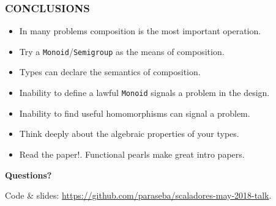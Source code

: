 \documentclass{beamer}
\begin{document}
\begin{frame} \frametitle{CONCLUSIONS}
  \begin{itemize}
    \item In many problems \alert{composition is the most important operation.}
    \item Try a \texttt{Monoid}/\texttt{Semigroup} as the means of composition.
    \item \alert{Types} can declare the \alert{semantics of composition.}
    \item Inability to define a lawful \texttt{Monoid} signals a problem in
        the design.
    \item Inability to find useful homomorphisms can signal a problem.
    \item Think deeply about the algebraic properties of your types.
    \item \alert{Read the paper!.} Functional pearls make great intro papers.
  \end{itemize}

  \begin{block}{}
    \centering
    \bf
    \Huge{Questions?}
  \end{block}

  Code \& slides: \href{https://github.com/paraseba/scaladores-may-2018-talk}{https://github.com/paraseba/scaladores-may-2018-talk}.

\end{frame}
\end{document}

